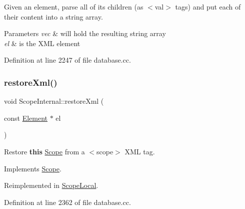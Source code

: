 Given an element, parse all of its children (as $<$val$>$ tags) and put each of their content into a string array. 
\begin{DoxyParams}{Parameters}
{\em vec} & will hold the resulting string array \\
\hline
{\em el} & is the X\+ML element \\
\hline
\end{DoxyParams}


Definition at line 2247 of file database.\+cc.

\mbox{\label{class_scope_internal_ad79bd78299b2bea6c0f4221682e81b07}} 
\subsubsection{\texorpdfstring{restoreXml()}{restoreXml()}}
{\footnotesize\ttfamily void Scope\+Internal\+::restore\+Xml (\begin{DoxyParamCaption}\item[{const \mbox{\hyperlink{class_element}{Element}} $\ast$}]{el }\end{DoxyParamCaption})\hspace{0.3cm}{\ttfamily [virtual]}}



Restore {\bfseries{this}} \mbox{\hyperlink{class_scope}{Scope}} from a $<$scope$>$ X\+ML tag. 



Implements \mbox{\hyperlink{class_scope_ad509027899b5f6af11f499f722d61f66}{Scope}}.



Reimplemented in \mbox{\hyperlink{class_scope_local_a5eeb1756bc706b8d5211fda106ad82ae}{Scope\+Local}}.



Definition at line 2362 of file database.\+cc.

